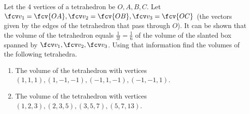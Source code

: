 Let the 4 vertices of a tetrahedron be $O, A, B, C$. Let $\fcv v_1=\fcv{OA}, \fcv v_2=\fcv{OB}, \fcv v_3=\fcv{OC}$ (the vectors given by the edges of the tetrahedron that pass through $O$). It can be shown that the volume of the tetrahedron equals $\frac{1}{3! } =\frac{1}{6}$ of the volume of the slanted box spanned by $\fcv v_1, \fcv v_2, \fcv v_3$. Using that information find the volumes of the following tetrahedra.
\begin{enumerate}
\item The volume of the tetrahedron with vertices $(1,1,1), (1,-1,-1), (-1,1,-1), (-1,-1,1)$.
\item The volume of the tetrahedron with vertices $(1,2,3), (2,3,5), (3,5,7), (5,7,13)$.
\end{enumerate}